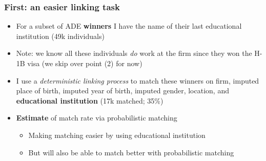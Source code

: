 \documentclass[xcolor=dvipsnames, compress, 12pt, aspectratio=169, handout]{beamer}
\begin{document}
\begin{frame}
    \frametitle{First: an easier linking task}
    \begin{itemize}
        \item For a subset of ADE \textbf{winners} I have the name of their last educational institution (49k individuals)
        \vspace{3mm}
        \item Note: we know all these individuals \textit{do} work at the firm since they won the H-1B visa (we skip over point (2) for now)
        \vspace{3mm}
        \item I use a \textit{deterministic linking process} to match these winners on firm, imputed place of birth, imputed year of birth, imputed gender, location, and \textbf{educational institution} (17k matched; 35\%)
        \vspace{3mm}
        \item \textbf{Estimate} of match rate via probabilistic matching
        \begin{itemize}
            \item Making matching easier by using educational institution
            \item But will also be able to match better with probabilistic matching
        \end{itemize}
        \vspace{3mm}
    \end{itemize}
\end{frame}
\end{document}
